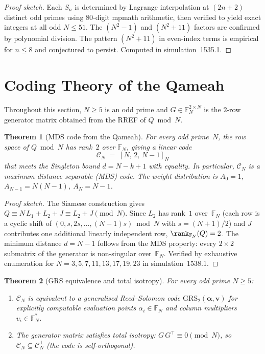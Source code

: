 \documentclass[aps,prd,twocolumn,superscriptaddress,floatfix,nofootinbib]{revtex4-2}
\newtheorem{theorem}{Theorem}
\theoremstyle{definition}
\theoremstyle{remark}
\begin{document}
\begin{proof}[Proof sketch]
Each $S_n$ is determined by Lagrange interpolation at
$(2n+2)$ distinct odd primes using 80-digit mpmath arithmetic,
then verified to yield exact integers at all odd $N \le 51$.
The $(N^2-1)$ and $(N^2+11)$ factors are confirmed by
polynomial division.  The pattern $(N^2+11)$ in even-index
terms is empirical for $n \le 8$ and conjectured to persist.
Computed in simulation~1535.1.
\end{proof}


\section{Coding Theory of the Qameah}\label{sec:coding}

Throughout this section, $N \ge 5$ is an odd prime and
$G \in \mathbb{F}_N^{2\times N}$ is the $2$-row generator matrix
obtained from the RREF of $Q \bmod N$.

\begin{theorem}[MDS code from the Qameah]%
  \label{thm:mds-qameah}
For every odd prime~$N$, the row space of $Q \bmod N$ has rank~$2$
over $\mathbb{F}_N$, giving a linear code
\[
  \mathcal{C}_N \;=\; [N,\,2,\,N\!-\!1]_N
\]
that meets the Singleton bound $d = N - k + 1$ with equality.
In particular, $\mathcal{C}_N$ is a maximum distance separable
(MDS) code.  The weight distribution is
$A_0 = 1$, $A_{N-1} = N(N-1)$, $A_N = N-1$.
\end{theorem}

\begin{proof}[Proof sketch]
The Siamese construction gives $Q \equiv N\,L_1 + L_2 + J
\equiv L_2 + J \pmod{N}$.  Since $L_2$ has rank~$1$
over~$\mathbb{F}_N$ (each row is a cyclic shift of
$(0,s,2s,\ldots,(N-1)s) \bmod N$ with $s = (N+1)/2$)
and $J$ contributes one additional linearly independent row,
$\rank_{\mathbb{F}_N}(Q) = 2$.
The minimum distance $d = N-1$ follows from the MDS
property: every $2\times 2$ submatrix of the generator
is non-singular over~$\mathbb{F}_N$.
Verified by exhaustive enumeration for
$N = 3,5,7,11,13,17,19,23$ in simulation~1538.1.
\end{proof}

\begin{theorem}[GRS equivalence and total isotropy]%
  \label{thm:grs-isotropy}
For every odd prime $N \ge 5$:
\begin{enumerate}[\upshape (a)]
\item $\mathcal{C}_N$ is equivalent to a generalised Reed--Solomon
  code $\mathrm{GRS}_2(\boldsymbol{\alpha},\mathbf{v})$
  for explicitly computable evaluation points
  $\alpha_i \in \mathbb{F}_N$ and column multipliers
  $v_i \in \mathbb{F}_N^*$.
\item The generator matrix satisfies total isotropy:
  $G\,G^{\!\top} \equiv 0 \pmod{N}$, so
  $\mathcal{C}_N \subseteq \mathcal{C}_N^{\perp}$
  (the code is self-orthogonal).
\end{enumerate}
\end{theorem}
\end{document}
